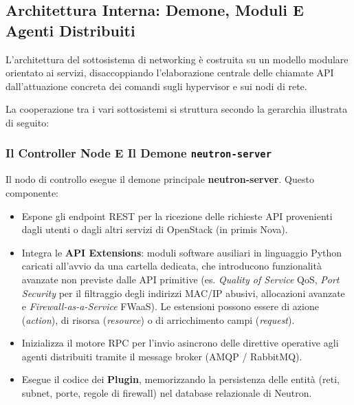 \documentclass[11pt, a4paper]{article}
\begin{document}
\newpage

\subsection{Architettura Interna: Demone, Moduli E Agenti Distribuiti}

L'architettura del sottosistema di networking è costruita su un modello modulare orientato ai servizi, disaccoppiando l'elaborazione centrale delle chiamate API dall'attuazione concreta dei comandi sugli hypervisor e sui nodi di rete.


La cooperazione tra i vari sottosistemi si struttura secondo la gerarchia illustrata di seguito:

\subsubsection{Il Controller Node E Il Demone \texttt{neutron-server}}

Il nodo di controllo esegue il demone principale \textbf{neutron-server}. Questo componente:
\begin{itemize}
    \item Espone gli endpoint REST per la ricezione delle richieste API provenienti dagli utenti o dagli altri servizi di OpenStack (in primis Nova).
    \item Integra le \textbf{API Extensions}: moduli software ausiliari in linguaggio Python caricati all'avvio da una cartella dedicata, che introducono funzionalità avanzate non previste dalle API primitive (es. \emph{Quality of Service} QoS, \emph{Port Security} per il filtraggio degli indirizzi MAC/IP abusivi, allocazioni avanzate e \emph{Firewall-as-a-Service} FWaaS). Le estensioni possono essere di azione (\emph{action}), di risorsa (\emph{resource}) o di arricchimento campi (\emph{request}).
    \item Inizializza il motore RPC per l'invio asincrono delle direttive operative agli agenti distribuiti tramite il message broker (AMQP / RabbitMQ).
    \item Esegue il codice dei \textbf{Plugin}, memorizzando la persistenza delle entità (reti, subnet, porte, regole di firewall) nel database relazionale di Neutron.
\end{itemize}
\end{document}
